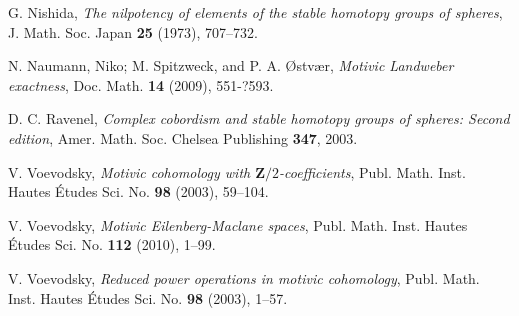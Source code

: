 \documentclass[10pt]{amsart}
\begin{document}
\begin{thebibliography}{NSO}
G. Nishida, 
{\it The nilpotency of elements of the stable homotopy groups of spheres},
J. Math. Soc. Japan \textbf{25} (1973), 707--732.

N. Naumann, Niko; M. Spitzweck, and P. A. \O stv\ae r, 
{\it Motivic Landweber exactness}, Doc. Math. \textbf{14} (2009), 551-?593.

D. C. Ravenel,
{\it Complex cobordism and stable homotopy groups of spheres: Second edition},
Amer. Math. Soc. Chelsea Publishing \textbf{347}, 2003.

V. Voevodsky, 
{\it Motivic cohomology with $\mathbf{Z}/2$-coefficients},
Publ. Math. Inst. Hautes \'Etudes Sci. No. \textbf{98} (2003), 59--104.

V. Voevodsky, 
{\it Motivic Eilenberg-Maclane spaces},
Publ. Math. Inst. Hautes \'Etudes Sci. No. \textbf{112} (2010), 1--99. 

V. Voevodsky, 
{\it Reduced power operations in motivic cohomology},
Publ. Math. Inst. Hautes \'Etudes Sci. No. \textbf{98} (2003), 1--57. 

\end{thebibliography}
\end{document}
